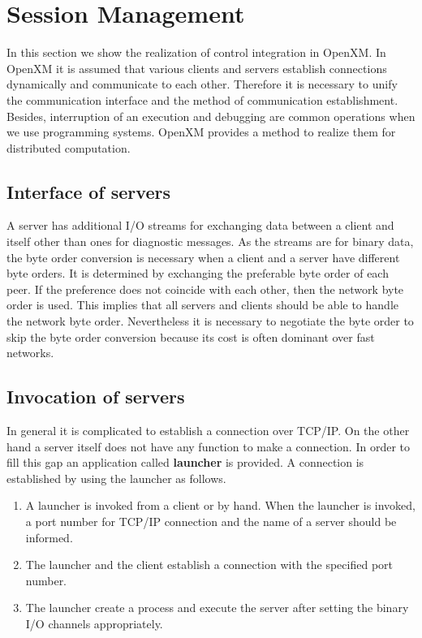 
\section{Session Management}
\label{secsession}
 
In this section we show the realization of control integration in
OpenXM.  In OpenXM it is assumed that various clients and servers
establish connections dynamically and communicate to each
other. Therefore it is necessary to unify the communication interface
and the method of communication establishment.  Besides, interruption
of an execution and debugging are common operations when we use
programming systems. OpenXM provides a method to realize them for
distributed computation.

\subsection{Interface of servers}

A server has additional I/O streams for exchanging data between
a client and itself other than ones for diagnostic
messages. As the streams are for binary data,
the byte order conversion is necessary when a
client and a server have different byte orders. It is determined by
exchanging the preferable byte order of each peer. If the preference
does not coincide with each other,
then the network byte order is used.
This implies that all servers and clients should be able to
handle the network byte
order. Nevertheless it is necessary to negotiate the byte order to
skip the byte order conversion because its cost is often dominant over
fast networks.

\subsection{Invocation of servers}
\label{launcher}

In general it is complicated to establish a connection over TCP/IP.
On the other hand a server itself does not have any function to
make a connection. In order to fill this gap an application called
{\bf launcher} is provided. A connection is established by using
the launcher as follows.

\begin{enumerate}
\item A launcher is invoked from a client or by hand.
When the launcher is invoked, a port number for TCP/IP connection
and the name of a server should be informed.
\item The launcher and the client establish a connection with the
specified port number.
\item The launcher create a process and execute the server after
setting the binary I/O channels appropriately.
\end{enumerate}

